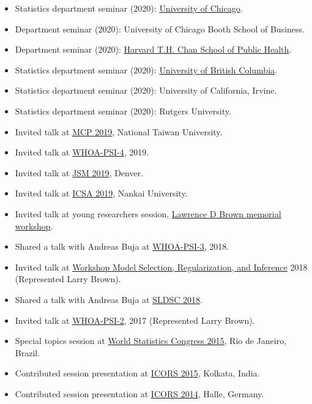 \documentclass[10pt]{article}
\numberwithin{myalgctr}{section}
\begin{document}
\begin{itemize}
\item Statistics department seminar (2020): \href{https://stat.uchicago.edu/events/event/1784/?past=y}{University of Chicago}.
\item Department seminar (2020): 
University of Chicago Booth School of Business.
\item Department seminar (2020): \href{https://www.hsph.harvard.edu/biostatistics/2020/02/upcoming-seminars/}{Harvard T.H. Chan School of Public Health}. \item Statistics department seminar (2020): \href{https://www.stat.ubc.ca/valid-post-selection-inference-why-and-how}{University of British Columbia}.
\item Statistics department seminar (2020): University of California, Irvine.
\item Statistics department seminar (2020): Rutgers University.
\item Invited talk at \href{https://2019mcp.smartevent.com.tw/}{MCP 2019}, National Taiwan University.
\item Invited talk at \href{https://www.math.wustl.edu/~kuffner/WHOA-PSI-4.html}{WHOA-PSI-4}, 2019.
\item Invited talk at \href{https://ww2.amstat.org/meetings/jsm/2019/onlineprogram/AbstractDetails.cfm?abstractid=302901}{JSM 2019}, Denver.
\item Invited talk at \href{http://www.icsa.org/icsa/events/2019-icsa-china-conference}{ICSA 2019}, Nankai University.
\item Invited talk at young researchers session, \href{https://cccfran.github.io/larrybrown2018/\#schedule}{Lawrence D Brown memorial workshop}.
\item Shared a talk with Andreas Buja at \href{https://www.math.wustl.edu/~kuffner/WHOA-PSI-3.html}{WHOA-PSI-3}, 2018.  
\item Invited talk at \href{https://www.univie.ac.at/seam/inference2018/}{Workshop Model Selection, Regularization, and Inference} 2018 (Represented Larry Brown).
\item Shared a talk with Andreas Buja at \href{https://publish.illinois.edu/sldsc2018/}{SLDSC 2018}.
\item Invited talk at \href{https://www.math.wustl.edu/~kuffner/WHOA-PSI-2.html}{WHOA-PSI-2}, 2017 (Represented Larry Brown).
\item Special topics session at \href{http://www.isi2015.ibge.gov.br/}{World Statistics Congress 2015}, Rio de Janeiro, Brazil.
\item Contributed session presentation at \href{https://www.isical.ac.in/~icors2015/}{ICORS 2015}, Kolkata, India.
\item Contributed session presentation at \href{https://statistik.wiwi.uni-halle.de/icors2014/}{ICORS 2014}, Halle, Germany.
\end{itemize}
\end{document}
